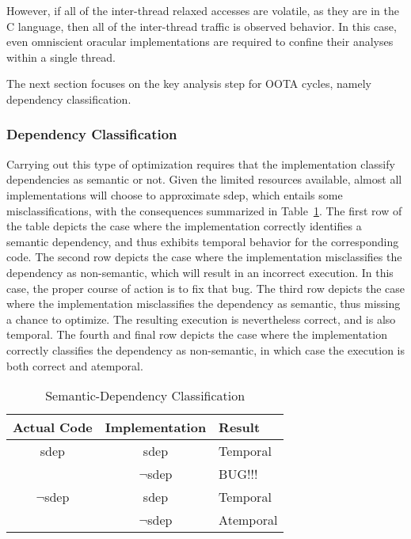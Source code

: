 \documentclass[10]{article}
\begin{document}
However, if all of the inter-thread relaxed accesses are volatile,
as they are in the C language, then all of the inter-thread traffic is
observed behavior.
In this case, even omniscient oracular implementations are required
to confine their analyses within a single thread.

The next section focuses on the key analysis step for OOTA cycles,
namely dependency classification.

\subsubsection{Dependency Classification}
\label{sec:Dependency Classification}

Carrying out this type of optimization requires that the implementation
classify dependencies as semantic or not.
Given the limited resources available, almost all implementations will
choose to approximate sdep, which entails some misclassifications, with
the consequences summarized in
Table~\ref{tab:Semantic-Dependency Classification}.
The first row of the table depicts the case where the implementation
correctly identifies a semantic dependency, and thus exhibits temporal
behavior for the corresponding code.
The second row depicts the case where the implementation misclassifies
the dependency as non-semantic, which will result in an incorrect
execution.
In this case, the proper course of action is to fix that bug.
The third row depicts the case where the implementation misclassifies
the dependency as semantic, thus missing a chance to optimize.
The resulting execution is nevertheless correct, and is also temporal.
The fourth and final row depicts the case where the implementation
correctly classifies the dependency as non-semantic, in which case
the execution is both correct and atemporal.

\begin{table}
\centering
\begin{tabular}{c|c|l}
Actual Code	& Implementation	& Result \\
\hline
sdep		& sdep			& Temporal \\
\cline{2-3}
		& $\neg$sdep		& BUG!!! \\
\hline
$\neg$sdep	& sdep			& Temporal \\
\cline{2-3}
		& $\neg$sdep		& Atemporal \\
\end{tabular}
\caption{Semantic-Dependency Classification}
\label{tab:Semantic-Dependency Classification}
\end{table}
\end{document}
